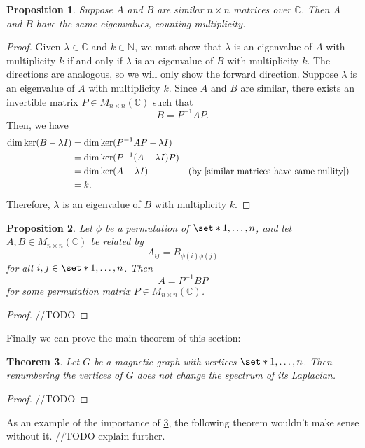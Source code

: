 \documentclass[12pt]{article}
\newtheorem{thm}{Theorem}
\newtheorem{prop}[thm]{Proposition}
\theoremstyle{definition}
\newcommand{\N}{\mathbb N}
\newcommand{\C}{\mathbb C}
\begin{document}
\begin{prop}
Suppose $A$ and $B$ are similar $n \times n$ matrices over $\C$. Then $A$ and $B$ have the same eigenvalues, counting multiplicity.
\end{prop}
\begin{proof}
Given $\lambda \in \C$ and $k \in \N$, we must show that $\lambda$ is an eigenvalue of $A$ with multiplicity $k$ if and only if $\lambda$ is an eigenvalue of $B$ with multiplicity $k$. The directions are analogous, so we will only show the forward direction. Suppose $\lambda$ is an eigenvalue of $A$ with multiplicity $k$. Since $A$ and $B$ are similar, there exists an invertible matrix $P \in M_{n \times n}(\C)$ such that 
$$B = P^{-1} A P.$$
Then, we have
\begin{align*}
\dim \ker (B - \lambda I) 
&= \dim \ker (P^{-1} A P - \lambda I) \\
&= \dim \ker (P^{-1} (A - \lambda I) P) \\
&= \dim \ker (A - \lambda I) &&\text{(by \cref{similar matrices have same nullity})} \\
&= k.
\end{align*}
Therefore, $\lambda$ is an eigenvalue of $B$ with multiplicity $k$.
\end{proof}

\begin{prop}
Let $\phi$ be a permutation of $\set*{1, \dots, n}$, and let $A, B \in M_{n \times n}(\C)$ be related by 
$$A_{ij} = B_{\phi(i)\phi(j)}$$
for all $i, j \in \set*{1, \dots, n}$. Then
$$A=P^{-1}BP$$
for some permutation matrix $P \in M_{n \times n}(\C)$.
\end{prop}
\begin{proof}
//TODO
\end{proof}

Finally we can prove the main theorem of this section:

\begin{thm}\label{renumbering vertices doesn't change Laplacian spectrum}
Let $G$ be a magnetic graph with vertices $\set*{1, \dots, n}$. Then renumbering the vertices of $G$ does not change the spectrum of its Laplacian.
\end{thm}
\begin{proof}
//TODO
\end{proof}

As an example of the importance of \cref{renumbering vertices doesn't change Laplacian spectrum}, the following theorem wouldn't make sense without it. //TODO explain further.
\end{document}
